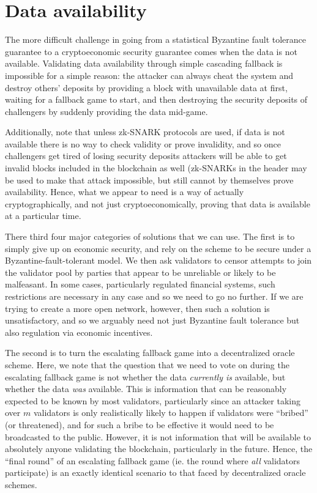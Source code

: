 \documentclass[11pt,a4paper]{report}
\theoremstyle{plain}
\theoremstyle{definition}
\theoremstyle{remark}
\begin{document}
\chapter{Data availability}

The more difficult challenge in going from a statistical Byzantine fault tolerance guarantee to a cryptoeconomic security guarantee comes when the data is not available. Validating data availability through simple cascading fallback is impossible for a simple reason: the attacker can always cheat the system and destroy others' deposits by providing a block with unavailable data at first, waiting for a fallback game to start, and then destroying the security deposits of challengers by suddenly providing the data mid-game.

Additionally, note that unless zk-SNARK protocols are used, if data is not available there is no way to check validity or prove invalidity, and so once challengers get tired of losing security deposits attackers will be able to get invalid blocks included in the blockchain as well (zk-SNARKs in the header may be used to make that attack impossible, but still cannot by themselves prove availability. Hence, what we appear to need is a way of actually cryptographically, and not just cryptoeconomically, proving that data is available at a particular time.

There third four major categories of solutions that we can use. The first is to simply give up on economic security, and rely on the scheme to be secure under a Byzantine-fault-tolerant model. We then ask validators to censor attempts to join the validator pool by parties that appear to be unreliable or likely to be malfeasant. In some cases, particularly regulated financial systems, such restrictions are necessary in any case and so we need to go no further. If we are trying to create a more open network, however, then such a solution is unsatisfactory, and so we arguably need not just Byzantine fault tolerance but also regulation via economic incentives.

The second is to turn the escalating fallback game into a decentralized oracle scheme. Here, we note that the question that we need to vote on during the escalating fallback game is not whether the data \emph{currently is} available, but whether the data \emph{was} available. This is information that can be reasonably expected to be known by most validators, particularly since an attacker taking over $m$ validators is only realistically likely to happen if validators were ``bribed'' (or threatened), and for such a bribe to be effective it would need to be broadcasted to the public. However, it is not information that will be available to absolutely anyone validating the blockchain, particularly in the future. Hence, the ``final round'' of an escalating fallback game (ie. the round where \emph{all} validators participate) is an exactly identical scenario to that faced by decentralized oracle schemes.
\end{document}

